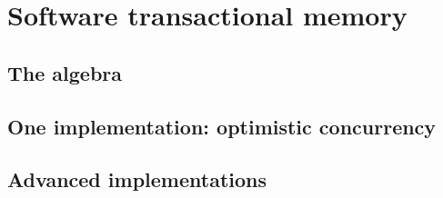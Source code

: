\chapter{Software transactional memory}

\section{The algebra}
\section{One implementation: optimistic concurrency}
\section{Advanced implementations}
